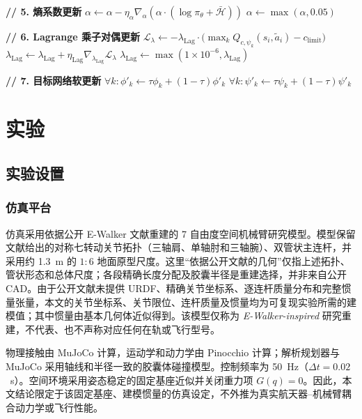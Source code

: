 \documentclass[10pt,conference]{IEEEtran}
\begin{document}
\begin{algorithm}[htbp]
\begin{algorithmic}[1]
            \State \textbf{// 5. 熵系数更新}
            \State $\alpha \gets \alpha - \eta_\alpha \nabla_\alpha (\alpha \cdot (\log \pi_\theta + \bar{\mathcal{H}}))$
            \State $\alpha \gets \max(\alpha, 0.05)$

            \State \textbf{// 6. Lagrange 乘子对偶更新}
            \State $\mathcal{L}_{\lambda} \gets -\lambda_{\text{Lag}} \cdot \big( \max_k Q_{c,\psi_k}(s_i,\tilde{a}_i) - c_{\text{limit}} \big)$
            \State $\lambda_{\text{Lag}} \gets \lambda_{\text{Lag}} + \eta_{\text{Lag}} \nabla_{\lambda_{\text{Lag}}} \mathcal{L}_{\lambda}$
            \State $\lambda_{\text{Lag}} \gets \max(1\times10^{-6}, \lambda_{\text{Lag}})$
        \EndIf

        \State \textbf{// 7. 目标网络软更新}
        \State $\forall k: \phi'_k \gets \tau \phi_k + (1-\tau)\phi'_k$
        \State $\forall k: \psi'_k \gets \tau \psi_k + (1-\tau)\psi'_k$
    \EndIf
\EndWhile
\end{algorithmic}
\end{algorithm}

\section{实验}
\label{sec:experiments}

\subsection{实验设置}

\subsubsection{仿真平台}
仿真采用依据公开 E-Walker 文献重建的 7 自由度空间机械臂研究模型\cite{nair2022ewalker}。模型保留文献给出的对称七转动关节拓扑（三轴肩、单轴肘和三轴腕）、双管状主连杆，并采用约 1.3~m 的 $1{:}6$ 地面原型尺度。这里“依据公开文献的几何”仅指上述拓扑、管状形态和总体尺度；各段精确长度分配及胶囊半径是重建选择，并非来自公开 CAD。由于公开文献未提供 URDF、精确关节坐标系、逐连杆质量分布和完整惯量张量，本文的关节坐标系、关节限位、连杆质量及惯量均为可复现实验所需的建模值；其中惯量由基本几何体近似得到。该模型仅称为 \emph{E-Walker-inspired} 研究重建，不代表、也不声称对应任何在轨或飞行型号。

物理接触由 MuJoCo 计算，运动学和动力学由 Pinocchio 计算；解析规划器与 MuJoCo 采用轴线和半径一致的胶囊体碰撞模型。控制频率为 50~Hz（$\Delta t = 0.02$~s）。空间环境采用姿态稳定的固定基座近似并关闭重力项 $G(q)=0$。因此，本文结论限定于该固定基座、建模惯量的仿真设定，不外推为真实航天器--机械臂耦合动力学或飞行性能。
\end{document}
